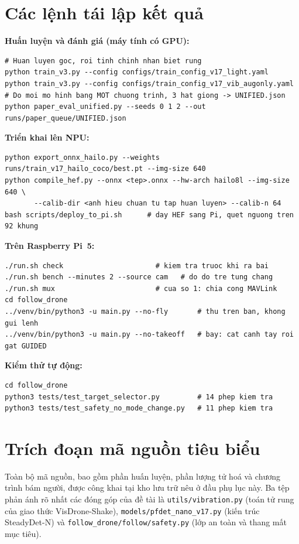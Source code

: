 \section{Các lệnh tái lập kết quả}

\textbf{Huấn luyện và đánh giá (máy tính có GPU):}
\begin{lstlisting}
# Huan luyen goc, roi tinh chinh nhan biet rung
python train_v3.py --config configs/train_config_v17_light.yaml
python train_v3.py --config configs/train_config_v17_vib_augonly.yaml
# Do moi mo hinh bang MOT chuong trinh, 3 hat giong -> UNIFIED.json
python paper_eval_unified.py --seeds 0 1 2 --out runs/paper_queue/UNIFIED.json
\end{lstlisting}

\textbf{Triển khai lên NPU:}
\begin{lstlisting}
python export_onnx_hailo.py --weights runs/train_v17_hailo_coco/best.pt --img-size 640
python compile_hef.py --onnx <tep>.onnx --hw-arch hailo8l --img-size 640 \
       --calib-dir <anh hieu chuan tu tap huan luyen> --calib-n 64
bash scripts/deploy_to_pi.sh      # day HEF sang Pi, quet nguong tren 92 khung
\end{lstlisting}

\textbf{Trên Raspberry Pi~5:}
\begin{lstlisting}
./run.sh check                      # kiem tra truoc khi ra bai
./run.sh bench --minutes 2 --source cam   # do do tre tung chang
./run.sh mux                        # cua so 1: chia cong MAVLink
cd follow_drone
../venv/bin/python3 -u main.py --no-fly       # thu tren ban, khong gui lenh
../venv/bin/python3 -u main.py --no-takeoff   # bay: cat canh tay roi gat GUIDED
\end{lstlisting}

\textbf{Kiểm thử tự động:}
\begin{lstlisting}
cd follow_drone
python3 tests/test_target_selector.py         # 14 phep kiem tra
python3 tests/test_safety_no_mode_change.py   # 11 phep kiem tra
\end{lstlisting}

\section{Trích đoạn mã nguồn tiêu biểu}

Toàn bộ mã nguồn, bao gồm phần huấn luyện, phần lượng tử hoá và chương trình bám người, được công khai tại kho lưu trữ nêu ở đầu phụ lục này. Ba tệp phản ánh rõ nhất các đóng góp của đề tài là \texttt{utils/vibration.py} (toán tử rung của giao thức VisDrone-Shake), \texttt{models/pfdet\_nano\_v17.py} (kiến trúc SteadyDet-N) và \texttt{follow\_drone/follow/safety.py} (lớp an toàn và thang mất mục tiêu).
